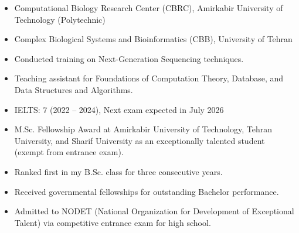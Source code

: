 \documentclass[11pt,a4paper,ragged2e]{altacv}
\begin{document}
\begin{itemize}[label=\textcolor{purpleDaffodi}{\textbullet}]
   \item Computational Biology Research Center (CBRC), Amirkabir University of Technology (Polytechnic)
    \item Complex Biological Systems and Bioinformatics (CBB), University of Tehran
\end{itemize}

\begin{itemize}[label=\textcolor{purpleDaffodi}{\textbullet}]
    \item Conducted training on Next-Generation Sequencing techniques.
\end{itemize}

\begin{itemize}[label=\textcolor{purpleDaffodi}{\textbullet}]
\item Teaching assistant for Foundations of Computation Theory, Database, and Data Structures and Algorithms.
\end{itemize}



\begin{itemize}[label=\textcolor{purpleDaffodi}{\textbullet}] 
    \item IELTS: 7 (2022 -- 2024), Next exam expected in July 2026
\end{itemize}


\begin{itemize}[label=\textcolor{purpleDaffodi}{\textbullet}]
\Small
    \item M.Sc. Fellowship Award at Amirkabir University of Technology, Tehran University, and Sharif University as an exceptionally talented student (exempt from entrance exam).
    \item Ranked first in my B.Sc. class for three consecutive years.
    \item Received governmental fellowships for outstanding Bachelor performance.
    \item Admitted to NODET (National Organization for Development of Exceptional Talent) via competitive entrance exam for high school.
\end{itemize}
\end{document}
